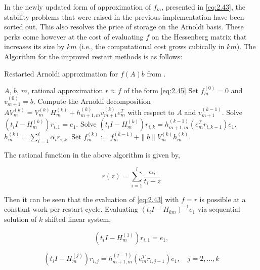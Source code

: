 In the newly updated form of approximation of $f_{m}$, presented in \ref{eq:2.43}, the stability problems that were raised in the previous implementation have been sorted out. This also resolves the price of storage on the Arnoldi basis. These perks come however at the cost of evaluating $f$ on the Hessenberg matrix that increases its size by $km$ (i.e., the computational cost grows cubically in $km$). The Algorithm for the improved restart methods is as follows:

\begin{algorithm}[H]
    \caption{Restarted Arnoldi approximation for $f(A)b$ from \cite{59}.}
    \label{alg:restarted_arnoldi_approximation}
    \begin{algorithmic}[1]
    \REQUIRE $A$, $b$, $m$, rational approximation $r \approx f$ of the form \ref{eq:2.45}
    \STATE Set $f^{(0)}_m = 0$ and $v^{(0)}_{m+1} = b$.
        \STATE Compute the Arnoldi decomposition $AV^{(k)}_m = V^{(k)}_m H^{(k)}_m + h^{(k)}_{m+1,m} v^{(k)}_{m+1} e_m^T$ with respect to $A$ and $v^{(k-1)}_{m+1}$.
                \STATE Solve $(t_i I - H^{(k)}_m) r_{i,1} = e_1$.
            \ENDFOR
        \ELSE
                \STATE Solve $(t_i I - H^{(k)}_m) r_{i,k} = h^{(k-1)}_{m+1,m} (e_m^T r_{i,k-1}) e_1$.
            \ENDFOR
        \ENDIF
        \STATE $h^{(k)}_m = \sum_{i=1}^{\ell} \alpha_i r_{i,k}$.
        \STATE Set $f^{(k)}_m := f^{(k-1)}_m + \|b\|V^{(k)}_m h^{(k)}_m$.
    \ENDFOR
    \end{algorithmic}
\end{algorithm}

The rational function in the above algorithm is given by,

\begin{equation}
    r(z) = \sum_{i=1}^{l} \frac{\alpha_{i}}{t_{i} - z}
    \label{eq:2.45}
\end{equation}

Then it can be seen that the evaluation of \ref{eq:2.43} with $f=r$ is possible at a constant work per restart cycle. Evaluating $(t_{i} I - H_{km})^{-1} e_{1}$ via sequential solution of $k$ shifted linear system,

\begin{equation}
    (t_{i} I - H^{(1)}_{m}) r_{i,1} = e_{1}, 
    \label{eq:2.46}
\end{equation}

\begin{equation}
    (t_{i} I - H^{(j)}_{m}) r_{i,j} = h^{(j-1)}_{m+1,m} (e_{m}^{T} r_{i,j-1}) e_{1}, \quad j = 2, \ldots, k
    \label{eq:2.47}
\end{equation}

